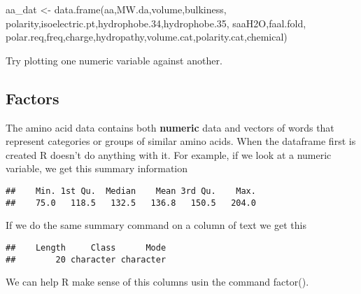 \documentclass[
]{book}
\newenvironment{Shaded}{\begin{snugshade}}{\end{snugshade}}
\newcommand{\FloatTok}[1]{\textcolor[rgb]{0.00,0.00,0.81}{#1}}
\newcommand{\FunctionTok}[1]{\textcolor[rgb]{0.00,0.00,0.00}{#1}}
\newcommand{\NormalTok}[1]{#1}
\newcommand{\OtherTok}[1]{\textcolor[rgb]{0.56,0.35,0.01}{#1}}
\newcommand{\SpecialCharTok}[1]{\textcolor[rgb]{0.00,0.00,0.00}{#1}}
\begin{document}
\begin{Shaded}
\begin{Highlighting}[]
\NormalTok{aa\_dat }\OtherTok{\textless{}{-}} \FunctionTok{data.frame}\NormalTok{(aa,MW.da,volume,bulkiness,}
\NormalTok{polarity,isoelectric.pt,hydrophobe}\FloatTok{.34}\NormalTok{,hydrophobe}\FloatTok{.35}\NormalTok{,}
\NormalTok{saaH2O,faal.fold, polar.req,freq,charge,hydropathy,volume.cat,polarity.cat,chemical)}
\end{Highlighting}
\end{Shaded}

Try plotting one numeric variable against another.

\hypertarget{factors}{%
\subsection{Factors}\label{factors}}

The amino acid data contains both \textbf{numeric} data and vectors of words that represent categories or groups of similar amino acids. When the dataframe first is created R doesn't do anything with it. For example, if we look at a numeric variable, we get this summary information

\begin{Shaded}
\end{Shaded}

\begin{verbatim}
##    Min. 1st Qu.  Median    Mean 3rd Qu.    Max. 
##    75.0   118.5   132.5   136.8   150.5   204.0
\end{verbatim}

If we do the same summary command on a column of text we get this

\begin{Shaded}
\end{Shaded}

\begin{verbatim}
##    Length     Class      Mode 
##        20 character character
\end{verbatim}

We can help R make sense of this columns usin the command factor().

\begin{Shaded}
\end{Shaded}
\end{document}
